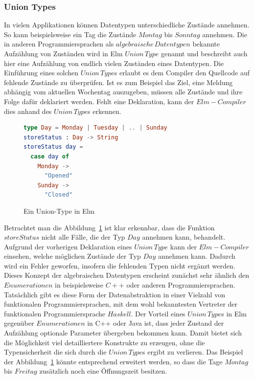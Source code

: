 \subsubsection{Union Types}
\label{sec:Union-Types}
In vielen Applikationen können Datentypen unterschiedliche Zustände annehmen. So kann beispielsweise ein Tag die Zustände $Montag$ bis $Sonntag$ annehmen. Die in anderen Programmiersprachen als $algebraische\,Datentypen$\cite[Vgl.]{algebraische-datentypen} bekannte Aufzählung von Zuständen wird in Elm $Union\,Type$ genannt und beschreibt auch hier eine Aufzählung von endlich vielen Zuständen eines Datentypen. Die Einführung eines solchen $Union\,Type$s erlaubt es dem Compiler den Quellcode auf fehlende Zustände zu überprüfen. Ist es zum Beispiel das Ziel, eine Meldung abhängig vom aktuellen Wochentag auszugeben, müssen alle Zustände und ihre Folge dafür deklariert werden. Fehlt eine Deklaration, kann der $Elm-Compiler$ dies anhand des $Union\,Type$s erkennen.
\begin{figure}[h]
\begin{lstlisting}[language=Elm]
type Day = Monday | Tuesday | .. | Sunday
storeStatus : Day -> String
storeStatus day =
  case day of
    Monday ->
      "Opened"
    Sunday ->
      "Closed"
\end{lstlisting}
\caption{Ein Union-Type in Elm}\label{fig:elm-union-type}
\end{figure}
Betrachtet man die Abbildung~\ref{fig:elm-union-type} ist klar erkennbar, dass die Funktion $storeStatus$ nicht alle Fälle, die der Typ $Day$ annehmen kann, behandelt. Aufgrund der vorherigen Deklaration eines $Union\,Type$ kann der $Elm-Compiler$ einsehen, welche möglichen Zustände der Typ $Day$ annehmen kann. Dadurch wird ein Fehler geworfen, insofern die fehlenden Typen nicht ergänzt werden. Dieses Konzept der algebraischen Datentypen erscheint zunächst sehr ähnlich den $Enumerationen$ in beispielsweise $C++$ oder anderen Programmiersprachen. Tatsächlich gibt es diese Form der Datenabstraktion in einer Vielzahl von funktionalen Programmiersprachen, mit dem wohl bekanntesten Vertreter der funktionalen Programmiersprache $Haskell$. Der Vorteil eines $Union\,Type$s in Elm gegenüber $Enumerationen$ in C++ oder Java ist, dass jeder Zustand der Aufzählung optionale Parameter übergeben bekommen kann. Damit bietet sich die Möglichkeit viel detailliertere Konstrukte zu erzeugen, ohne die Typensicherheit die sich durch die $Union\,Type$s ergibt zu verlieren. Das Beispiel der Abbildung~\ref{fig:elm-union-type} könnte entsprechend erweitert werden, so dass die Tage $Montag$ bis $Freitag$ zusätzlich noch eine Öffnungszeit besitzen.
